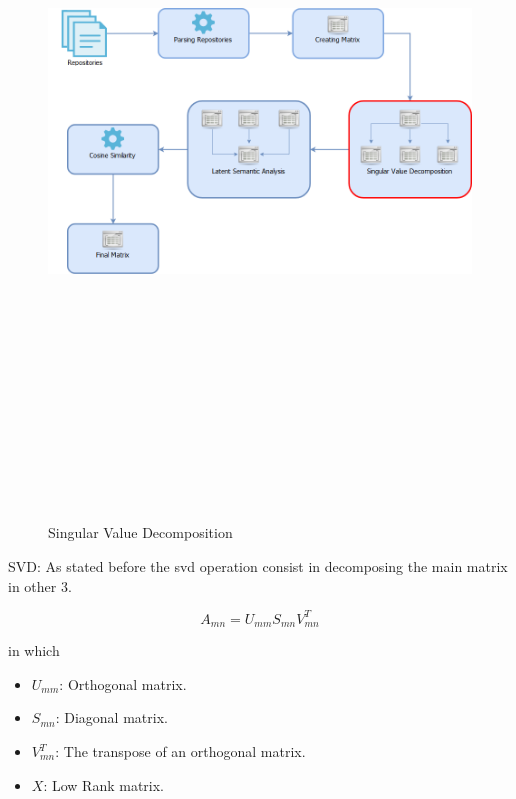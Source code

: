 \begin{figure}[H]
\includegraphics[width=15cm,height=20cm,keepaspectratio]{images/Architecture3.png}
\caption{Singular Value Decomposition}
\end{figure}

SVD: As stated before the svd operation consist in decomposing the main matrix in other 3.

\begin{equation}
A_{mn}=U_{mm}S_{mn}V_{mn}^{T}
\end{equation}

in which

\begin{itemize}
	\item $U_{mm}$: Orthogonal matrix.
	\item $S_{mn}$: Diagonal matrix.
	\item $V_{mn}^{T}$: The transpose of an orthogonal matrix.
	\item $X$: Low Rank matrix.
\end{itemize}

